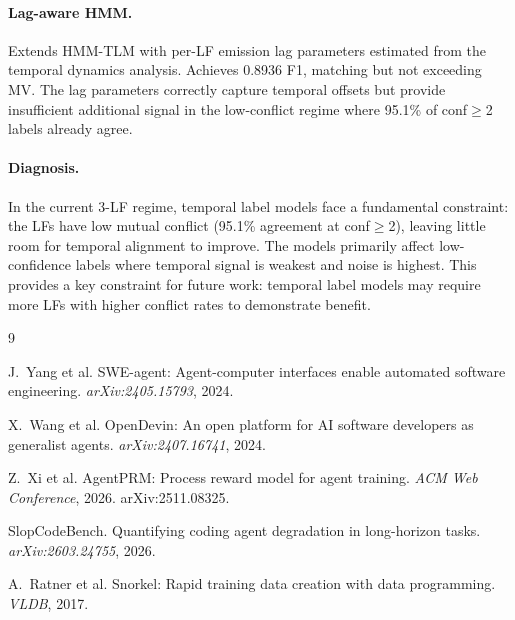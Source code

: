\documentclass[11pt,a4paper]{article}
\begin{document}
\paragraph{Lag-aware HMM.} Extends HMM-TLM with per-LF emission lag parameters estimated from the temporal dynamics analysis. Achieves 0.8936 F1, matching but not exceeding MV. The lag parameters correctly capture temporal offsets but provide insufficient additional signal in the low-conflict regime where 95.1\% of conf$\geq$2 labels already agree.

\paragraph{Diagnosis.} In the current 3-LF regime, temporal label models face a fundamental constraint: the LFs have low mutual conflict (95.1\% agreement at conf$\geq$2), leaving little room for temporal alignment to improve. The models primarily affect low-confidence labels where temporal signal is weakest and noise is highest. This provides a key constraint for future work: temporal label models may require more LFs with higher conflict rates to demonstrate benefit.

\begin{thebibliography}{9}

J.~Yang et al.
\newblock SWE-agent: Agent-computer interfaces enable automated software engineering.
\newblock \emph{arXiv:2405.15793}, 2024.

X.~Wang et al.
\newblock OpenDevin: An open platform for AI software developers as generalist agents.
\newblock \emph{arXiv:2407.16741}, 2024.

Z.~Xi et al.
\newblock AgentPRM: Process reward model for agent training.
\newblock \emph{ACM Web Conference}, 2026. arXiv:2511.08325.

SlopCodeBench.
\newblock Quantifying coding agent degradation in long-horizon tasks.
\newblock \emph{arXiv:2603.24755}, 2026.

A.~Ratner et al.
\newblock Snorkel: Rapid training data creation with data programming.
\newblock \emph{VLDB}, 2017.

\end{thebibliography}
\end{document}
